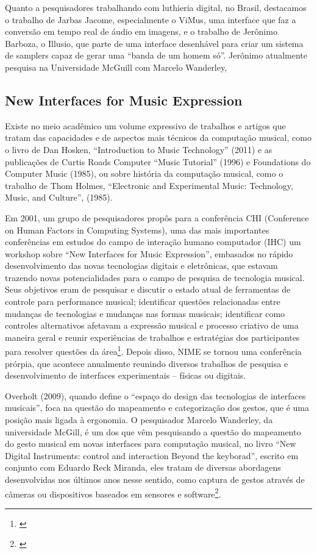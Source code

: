 Quanto a pesquisadores trabalhando com luthieria digital, no Brasil, destacamos o trabalho de Jarbas Jacome, especialmente o ViMus, uma interface que faz a conversão em tempo real de áudio em imagens, e o trabalho de Jerônimo Barboza, o Illusio, que parte de uma interface desenhável para criar um sistema de samplers capaz de gerar uma ``banda de um homem só''. Jerônimo atualmente pesquisa na Universidade McGuill com Marcelo Wanderley, 


\subsection{New Interfaces for Music Expression}





Existe no meio acadêmico um volume expressivo de trabalhos e artigos que tratam das capacidades e de aspectos mais técnicos da computação musical, como o livro de Dan Hosken, ``Introduction to Music Technology'' (2011) e as publicações de Curtis Roads Computer ``Music Tutorial'' (1996) e Foundations do Computer Music (1985), ou sobre história da computação musical, como o trabalho de Thom Holmes, ``Electronic and Experimental Music: Technology, Music, and Culture'', (1985). 

Em 2001, um grupo de pesquisadores propôs para a conferência CHI (Conference on Human Factors in Computing Systems), uma das mais importantes conferências em estudos do campo de interação humano computador (IHC) um workshop sobre ``New Interfaces for Music Expression'', embasados no rápido desenvolvimento das novas tecnologias digitais e eletrônicas, que estavam trazendo novas potencialidades para o campo de pesquisa de tecnologia musical. Seus objetivos eram de pesquisar e discutir o estado atual de ferramentas de controle para performance musical; identificar questões relacionadas entre mudanças de tecnologias e mudanças nas formas musicais; identificar como controles alternativos afetavam a expressão musical e processo criativo de uma maneira geral e reunir experiências de trabalhos e estratégias dos participantes para resolver questões da área\footnote{\cite{Poupyrev2001}}. Depois disso, NIME se tornou uma conferência prórpia, que acontece anualmente reunindo diversos trabalhos de pesquisa e desenvolvimento de interfaces experimentais – físicas ou digitais. 


Overholt (2009), quando define o ``espaço do design das tecnologias de interfaces musicais'', foca na questão do mapeamento e categorização dos gestos, que é uma posição mais ligada à ergonomia. O pesquisador Marcelo Wanderley, da universidade McGill, é um dos que vêm pesquisando a questão do mapeamento do gesto musical em novas interfaces para computação musical, no livro ``New Digital Instruments: control and interaction Beyond the keyborad'', escrito em conjunto com Eduardo Reck Miranda, eles tratam de diversas abordagens desenvolvidas nos últimos anos nesse sentido, como captura de gestos através de câmeras ou dispositivos baseados em sensores e software\footnote{\cite[67]{Miranda2006}}. 

